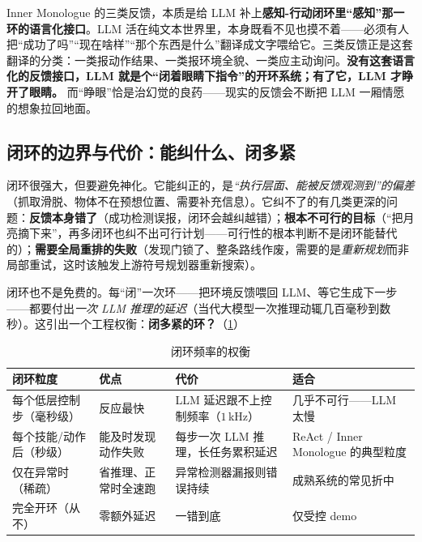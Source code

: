 \begin{insight}
Inner Monologue 的三类反馈，本质是给 LLM 补上\textbf{感知-行动闭环里“感知”那一环的语言化接口}。LLM 活在纯文本世界里，本身既看不见也摸不着——必须有人把“成功了吗”“现在啥样”“那个东西是什么”翻译成文字喂给它。三类反馈正是这套翻译的分类：一类报动作结果、一类报环境全貌、一类应主动询问。\textbf{没有这套语言化的反馈接口，LLM 就是个“闭着眼睛下指令”的开环系统；有了它，LLM 才睁开了眼睛。} 而“睁眼”恰是治幻觉的良药——现实的反馈会不断把 LLM 一厢情愿的想象拉回地面。
\end{insight}

\subsection{闭环的边界与代价：能纠什么、闭多紧}
\label{sec:closedloop-cost}

闭环很强大，但要避免神化。它能纠正的，是\emph{“执行层面、能被反馈观测到”的偏差}（抓取滑脱、物体不在预想位置、需要补充信息）。它纠不了的有几类更深的问题：\textbf{反馈本身错了}（成功检测误报，闭环会越纠越错）；\textbf{根本不可行的目标}（“把月亮摘下来”，再多闭环也纠不出可行计划——可行性的根本判断不是闭环能替代的）；\textbf{需要全局重排的失败}（发现门锁了、整条路线作废，需要的是\emph{重新规划}而非局部重试，这时该触发上游符号规划器重新搜索）。

闭环也不是免费的。每“闭”一次环——把环境反馈喂回 LLM、等它生成下一步——都要付出\emph{一次 LLM 推理的延迟}（当代大模型一次推理动辄几百毫秒到数秒）。这引出一个工程权衡：\textbf{闭多紧的环？}（\cref{tab:closedloop-freq}）

\begin{table}[H]\centering\small
\caption{闭环频率的权衡}
\label{tab:closedloop-freq}
\begin{tabular}{p{2.8cm}p{2.6cm}p{2.6cm}p{4.0cm}}
\toprule
闭环粒度 & 优点 & 代价 & 适合 \\
\midrule
每个低层控制步（毫秒级） & 反应最快 & LLM 延迟跟不上控制频率（$1\,$kHz） & 几乎不可行——LLM 太慢 \\
每个技能/动作后（秒级） & 能及时发现动作失败 & 每步一次 LLM 推理，长任务累积延迟 & ReAct / Inner Monologue 的典型粒度 \\
仅在异常时（稀疏） & 省推理、正常时全速跑 & 异常检测器漏报则错误持续 & 成熟系统的常见折中 \\
完全开环（从不） & 零额外延迟 & 一错到底 & 仅受控 demo \\
\bottomrule
\end{tabular}
\end{table}


